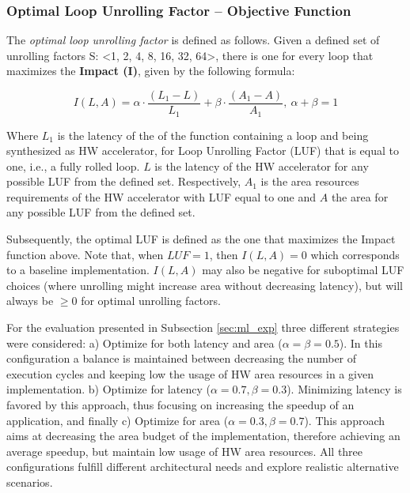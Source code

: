\documentclass[]{usiinfthesis}
\begin{document}
\subsubsection{Optimal Loop Unrolling Factor -- Objective Function}

The {\em optimal loop unrolling factor} is defined as follows.
Given a defined set of unrolling factors S: <1, 2, 4, 8, 16, 32, 64>, there is one for every
loop that maximizes the \textbf {Impact (I)}, given by the following formula:

$$I(L,A)= \alpha  \cdot \dfrac{ (L_1 - L)} {L_1} + \beta \cdot \dfrac{ (A_1 - A)} {A_1},\ \alpha + \beta = 1$$

Where $L_1$ is the latency of the of the function containing a loop and being synthesized as HW 
accelerator, for Loop Unrolling Factor (LUF) that is equal to one, i.e., a fully rolled loop. $L$ 
is the latency of the HW accelerator for any possible LUF from the defined set.
Respectively, $A_1$ is the area resources requirements of the HW accelerator with LUF equal to one and 
$A$ the area for any possible LUF from the defined set.\par

Subsequently, the optimal LUF is defined as the one that maximizes the Impact function above. Note that, 
when $LUF = 1$, then $I(L,A)=0$ which corresponds to a baseline implementation. $I(L,A)$ may also 
be negative for suboptimal LUF choices (where unrolling might increase area without decreasing 
latency), but will always be $\ge 0$ for optimal unrolling factors.\par


For the evaluation presented in Subsection \ref{sec:ml_exp}
three different strategies were considered: a) Optimize for both latency and area ($\alpha = 
\beta = 0.5$). In this configuration a balance is maintained between decreasing the number of 
execution cycles and keeping low the usage of HW area resources in a given implementation.
b) Optimize for latency ($\alpha = 0.7, \beta = 0.3$). Minimizing latency is favored by this
approach, thus focusing on increasing the speedup of an application, and finally c) Optimize
for area ($\alpha = 0.3, \beta = 0.7$). This approach aims at decreasing the area budget of 
the implementation, therefore achieving an average speedup, but maintain low usage of HW 
area resources. All three configurations fulfill different architectural needs and explore 
realistic alternative scenarios.\par

\end{document}
